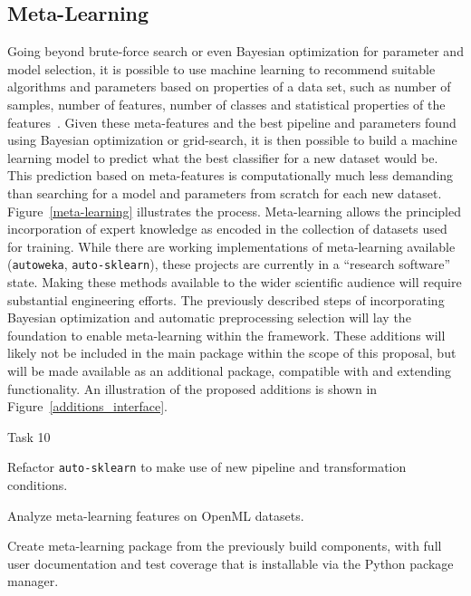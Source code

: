 \subsection{Meta-Learning}
Going beyond brute-force search or even Bayesian optimization for parameter and
model selection, it is possible to use machine learning to recommend suitable
algorithms and parameters based on properties of a data set, such as number of
samples, number of features, number of classes and statistical properties of
the features~\autocite{luo2015review, feurer-nips2015}.
Given these meta-features and the best pipeline and parameters found using
Bayesian optimization or grid-search, it is then possible to build a machine
learning model to predict what the best classifier for a new dataset would be.
This prediction based on meta-features is computationally much less demanding
than searching for a model and parameters from scratch for each new dataset.
Figure~\ref{meta-learning} illustrates the process.
Meta-learning allows the principled incorporation of expert knowledge as encoded
in the collection of datasets used for training.
While there are working implementations of meta-learning available
(\texttt{autoweka}, \texttt{auto-sklearn}),
these projects are currently in a ``research software'' state. Making these methods
available to the wider scientific audience will require substantial engineering
efforts. The previously described steps of incorporating Bayesian optimization
and automatic preprocessing selection will lay the foundation to enable
meta-learning within the \sklearn{} framework. These additions will likely not
be included in the main \sklearn{} package within the scope of this proposal,
but will be made available
as an additional package, compatible with and extending \sklearn{} functionality.
An illustration of the proposed additions is shown in Figure~\ref{additions_interface}.
\begin{labeling}{Task 10}
    \itemsep-4pt
    \item [Task 10] Refactor \texttt{auto-sklearn} to make use of new pipeline and transformation conditions.
    \item [Task 11] Analyze meta-learning features on OpenML datasets.
    \item [Task 12] Create meta-learning package from the previously build
        components, with full user documentation and test coverage that is
        installable via the Python package manager.
\end{labeling}

